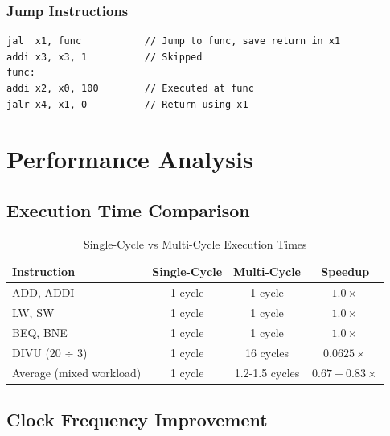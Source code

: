 \documentclass[a4paper, 11pt]{article}
\begin{document}
\subsubsection{Jump Instructions}
\begin{lstlisting}[caption=Jump Instruction Patterns]
jal  x1, func           // Jump to func, save return in x1
addi x3, x3, 1          // Skipped
func:
addi x2, x0, 100        // Executed at func
jalr x4, x1, 0          // Return using x1
\end{lstlisting}

\newpage

\section{Performance Analysis}

\subsection{Execution Time Comparison}

\begin{table}[H]
\centering
\caption{Single-Cycle vs Multi-Cycle Execution Times}
\begin{tabular}{|l|c|c|c|}
\hline
\textbf{Instruction} & \textbf{Single-Cycle} & \textbf{Multi-Cycle} & \textbf{Speedup} \\
\hline
ADD, ADDI & 1 cycle & 1 cycle & $1.0\times$ \\
\hline
LW, SW & 1 cycle & 1 cycle & $1.0\times$ \\
\hline
BEQ, BNE & 1 cycle & 1 cycle & $1.0\times$ \\
\hline
DIVU (20 ÷ 3) & 1 cycle & 16 cycles & $0.0625\times$ \\
\hline
Average (mixed workload) & 1 cycle & 1.2-1.5 cycles & $0.67-0.83\times$ \\
\hline
\end{tabular}
\end{table}

\subsection{Clock Frequency Improvement}
\end{document}
